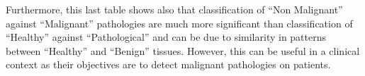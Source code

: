 Furthermore, this last table shows also that classification of “Non Malignant” against “Malignant” pathologies are much more significant than classification of “Healthy” against “Pathological” and can be due to similarity in patterns between “Healthy” and “Benign” tissues. However, this can be useful in a clinical context as their objectives are to detect malignant pathologies on patients.
